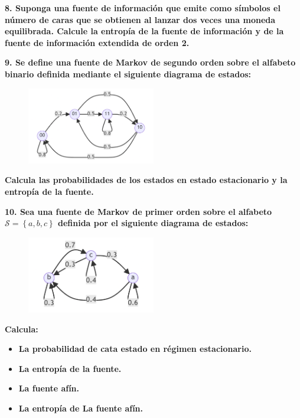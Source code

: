 \documentclass{article}
\begin{document}
\pagebreak

\textbf{
8. Suponga una fuente de información que emite como símbolos el número de caras que se obtienen al lanzar dos veces una moneda equilibrada. Calcule la entropía de la fuente de información y de la fuente de información extendida de orden 2.
}

\vspace{1cm}

\textbf{
9. Se define una fuente de Markov de segundo orden sobre el alfabeto binario definida mediante el siguiente diagrama de estados:
}

\begin{figure}[htbp!]
    \centering
    \includegraphics[width=0.5\textwidth]{./img/mermaid1.png}
\end{figure}

\textbf{
Calcula las probabilidades de los estados en estado estacionario y la entropía de la fuente.
}

\vspace{1cm}

\textbf{
10. Sea una fuente de Markov de primer orden sobre el alfabeto $\mathcal{S}=\left\{a,b,c\right\}$ definida por el siguiente diagrama de estados:
}

\begin{figure}[htbp!]
    \centering
    \includegraphics[width=0.5\textwidth]{./img/mermaid2.png}
\end{figure}

\textbf{Calcula:}

\begin{itemize}
    \item\textbf{La probabilidad de cata estado en régimen estacionario.}
    \item\textbf{La entropía de la fuente.}
    \item\textbf{La fuente afín.}
    \item\textbf{La entropía de La fuente afín.}
\end{itemize}
\end{document}
